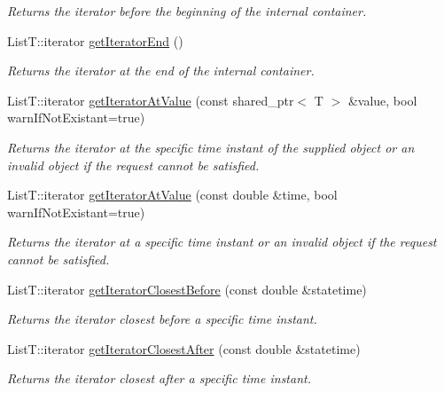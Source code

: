 \begin{DoxyCompactItemize}
\begin{DoxyCompactList}\small\item\em Returns the iterator before the beginning of the internal container. \end{DoxyCompactList}\item 
List\-T\-::iterator \hyperlink{classmsf__core_1_1SortedContainer_af1b1597192ac889cc918d8516cd6345c}{get\-Iterator\-End} ()
\begin{DoxyCompactList}\small\item\em Returns the iterator at the end of the internal container. \end{DoxyCompactList}\item 
List\-T\-::iterator \hyperlink{classmsf__core_1_1SortedContainer_a3ca27ff6fae8916a88a6690b9c8365a9}{get\-Iterator\-At\-Value} (const shared\-\_\-ptr$<$ T $>$ \&value, bool warn\-If\-Not\-Existant=true)
\begin{DoxyCompactList}\small\item\em Returns the iterator at the specific time instant of the supplied object or an invalid object if the request cannot be satisfied. \end{DoxyCompactList}\item 
List\-T\-::iterator \hyperlink{classmsf__core_1_1SortedContainer_a727a60e4eb00ab45b2a39c8c069d2fcf}{get\-Iterator\-At\-Value} (const double \&time, bool warn\-If\-Not\-Existant=true)
\begin{DoxyCompactList}\small\item\em Returns the iterator at a specific time instant or an invalid object if the request cannot be satisfied. \end{DoxyCompactList}\item 
List\-T\-::iterator \hyperlink{classmsf__core_1_1SortedContainer_a4cbd2aeae2f6dde2dfd0dceea4a8e928}{get\-Iterator\-Closest\-Before} (const double \&statetime)
\begin{DoxyCompactList}\small\item\em Returns the iterator closest before a specific time instant. \end{DoxyCompactList}\item 
List\-T\-::iterator \hyperlink{classmsf__core_1_1SortedContainer_a3c1f848e9874f9bdc4ab12645e699fcf}{get\-Iterator\-Closest\-After} (const double \&statetime)
\begin{DoxyCompactList}\small\item\em Returns the iterator closest after a specific time instant. \end{DoxyCompactList}\item 

\end{DoxyCompactItemize}
